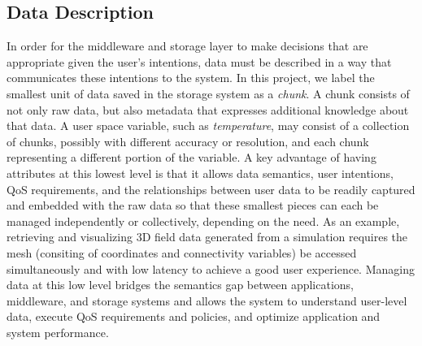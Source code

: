 \subsection{Data Description}
\label{sec:data-description}
In order for the middleware and storage layer to make decisions
that are appropriate given the user's intentions, data must be
described in a way that communicates these intentions to
the system. In this project, we label the smallest unit of data
saved in the storage system as a \textit{chunk}.  A chunk consists of not only
raw data, but also metadata that expresses additional
knowledge about that data.
A user space variable, such as \textit{temperature}, may
consist of a collection of chunks, possibly with different accuracy or
resolution, and each chunk representing
a different portion of the variable.
A key advantage of having attributes at this lowest level is that it allows data
semantics, user intentions, QoS requirements, and the relationships between user
data to be readily captured and embedded with the raw data so that these
smallest pieces can each be managed independently or collectively, depending on
the need. As an example, retrieving and visualizing 3D field data generated from a simulation
requires the mesh (consiting of coordinates and connectivity variables) be
accessed simultaneously and with low latency to achieve a good user experience.
Managing data at this low level
bridges the semantics gap between applications, middleware, and storage
systems and allows the system to understand user-level data, execute QoS
requirements and policies, and optimize application and system performance.


